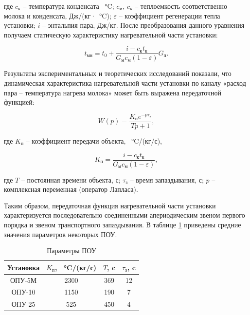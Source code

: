 где $c_\text{к}$ – температура конденсата \SI{}{\celsius}; $c_\text{м}$, $c_\text{к}$ – теплоемкость соответственно молока и конденсата, Дж/(кг·\SI{}{\celsius}); $\varepsilon$ – коэффициент регенерации тепла установки; $i$ – энтальпия пара, Дж/кг. После преобразования данного уравнения получаем статическую характеристику нагревательной части установки:

\begin{equation}
    t_\text{мн} = t_0 + \frac{i - c_\text{к} t_\text{к}}{G_\text{м} c_\text{м}(1 - \varepsilon)} G_\text{п}.
\end{equation}

Результаты экспериментальных и теоретических исследований показали, что динамическая характеристика нагревательной части установки по каналу «расход пара – температура нагрева молока» может быть выражена передаточной функцией:

\begin{equation}\label{steam_temp_relation}
    W(p) = \frac{K_\text{п} e^{-p \tau_\text{з}}} {Tp + 1},
\end{equation}

где $K_\text{п}$ – коэффициент передачи объекта, \SI{}{\celsius}/(кг/с),

\begin{equation}
    K_\text{п} = \frac{i - c_\text{к} t_\text{к}}{G_\text{м} c_\text{м}(1 - \varepsilon)},
\end{equation}

где $T$ – постоянная времени объекта, с; $\tau_\text{з}$ – время запаздывания, с; $p$ – комплексная переменная (оператор Лапласа).

Таким образом, передаточная функция нагревательной части установки характеризуется последовательно соединенными апериодическим звеном первого порядка и звеном транспортного запаздывания. В таблице \ref{table:pasterizer_params} приведены средние значения параметров некоторых ПОУ.

\begin{table} [H]
    \small
    \caption{Параметры ПОУ}\label{table:pasterizer_params}
    \centering
    \begin{tabular}{ | c | c | c | c | }
        \hline
        \textbf{Установка} & $K_\text{п}$, \SI{}{\celsius}/(кг/с) & $T$, c & $\tau_\text{з}$, c \\
        \hline
        ОПУ-5М             & 2300                                 & 369    & 12                 \\
        \hline
        ОПУ-10             & 1150                                 & 190    & 7                  \\
        \hline
        ОПУ-25             & 525                                  & 450    & 4                  \\
        \hline
    \end{tabular}
\end{table}

